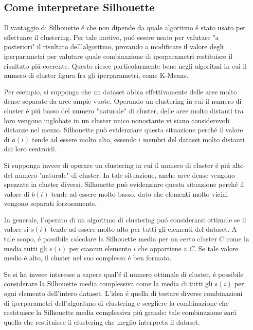 \documentclass[italian]{article}
\begin{document}
	\subsection{Come interpretare Silhouette}

		Il vantaggio di Silhouette é che non dipende da quale algoritmo
		é stato usato per effettuare il clustering. Per tale motivo, puó
		essere usato per valutare "a posteriori" il risultato dell'algoritmo,
		provando a modificare il valore degli iperparametri per valutare
		quale combinazione di iperparametri restituisce il risultato piú
		coerente. Questo riesce particolarmente bene negli algoritmi in
		cui il numero di cluster figura fra gli iperparametri, come K-Means.

		Per esempio, si supponga che un dataset abbia effettivamente
		delle aree molto dense separate da aree ampie vuote. Operando
		un clustering in cui il numero di cluster é piú basso del numero
		"naturale" di cluster, delle aree molto distanti tra loro vengono
		inglobate in un cluster unico nonostante vi siano considerevoli
		distanze nel mezzo. Silhouette può evidenziare questa situazione
		perché il valore di $a(i)$ tende ad essere molto alto, essendo
		i membri del dataset molto distanti dai loro centroidi.

		Si supponga invece di operare un clustering in cui il numero
		di cluster é piú alto del numero "naturale" di cluster. In tale
		situazione, anche aree dense vengono spezzate in cluster diversi.
		Silhouette può evidenziare questa situazione perché il valore di
		$b(i)$ tende ad essere molto basso, dato che elementi molto vicini
		vengono separati forzosamente.

		In generale, l'operato di un algoritmo di clustering puó
		considerarsi ottimale se il valore si $s(i)$ tende ad essere
		molto alto per tutti gli elementi del dataset. A tale scopo,
		é possibile calcolare la Silhouette media per un certo cluster
		$C$ come la media tutti gli $s(i)$ per ciascun elemento $i$
		che appartiene a $C$. Se tale valore medio é alto, il cluster
		nel suo complesso é ben formato.

		Se si ha invece interesse a sapere qual'é il numero ottimale di
		cluster, é possibile considerare la Silhouette media complessiva
		come la media di tutti gli $s(i)$ per ogni elemento dell'intero
		dataset. L'idea é quella di testare diverse combinazioni di
		iperparametri dell'algoritmo di clustering e scegliere la
		combinazione che restituisce la Silhouette media complessiva piú
		grande: tale combinazione sará quella che restituisce il clustering
		che meglio interpreta il dataset.
\end{document}
